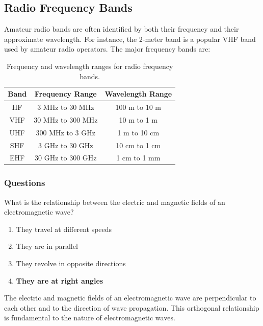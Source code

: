 \subsection{Radio Frequency Bands}
Amateur radio bands are often identified by both their frequency and their approximate wavelength. For instance, the 2-meter band is a popular VHF band used by amateur radio operators. The major frequency bands are:

\begin{table}[h]
    \centering
    \begin{tabular}{|c|c|c|}
        \hline
        \textbf{Band} & \textbf{Frequency Range} & \textbf{Wavelength Range} \\
        \hline
        HF & 3 MHz to 30 MHz & 100 m to 10 m \\
        VHF & 30 MHz to 300 MHz & 10 m to 1 m \\
        UHF & 300 MHz to 3 GHz & 1 m to 10 cm \\
        SHF & 3 GHz to 30 GHz & 10 cm to 1 cm \\
        EHF & 30 GHz to 300 GHz & 1 cm to 1 mm \\
        \hline
    \end{tabular}
    \caption{Frequency and wavelength ranges for radio frequency bands.}
    \label{tab:frequency-ranges}
\end{table}

\subsubsection*{Questions}

\begin{tcolorbox}[colback=gray!10!white,colframe=black!75!black,title={T3B01}]
What is the relationship between the electric and magnetic fields of an electromagnetic wave?
\begin{enumerate}[label=\Alph*),noitemsep]
    \item They travel at different speeds
    \item They are in parallel
    \item They revolve in opposite directions
    \item \textbf{They are at right angles}
\end{enumerate}
\end{tcolorbox}

The electric and magnetic fields of an electromagnetic wave are perpendicular to each other and to the direction of wave propagation. This orthogonal relationship is fundamental to the nature of electromagnetic waves.


